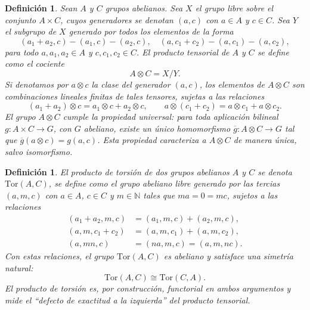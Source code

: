 \documentclass[12pt]{book}
\theoremstyle{plain}
\numberwithin{equation}{section} %
\newtheorem{definition}[thm]{Definición}
\begin{document}
\begin{definition}\label{def:tensor-product}
Sean $A$ y $C$ grupos abelianos. Sea $X$ el grupo libre sobre el conjunto
$A \times C$, cuyos generadores se denotan $(a,c)$ con $a \in A$ y $c \in C$.
Sea $Y$ el subgrupo de $X$ generado por todos los elementos de la forma
\[
(a_1 + a_2, c) - (a_1, c) - (a_2, c), \quad
(a, c_1 + c_2) - (a, c_1) - (a, c_2),
\]
para todo $a,a_1,a_2 \in A$ y $c,c_1,c_2 \in C$. El \textit{producto tensorial}
de $A$ y $C$ se define como el cociente
\[
A \otimes C = X / Y.
\]
Si denotamos por $a \otimes c$ la clase del generador $(a,c)$, los elementos de
$A \otimes C$ son combinaciones lineales finitas de tales tensores, sujetas a
las relaciones
\[
(a_1 + a_2) \otimes c = a_1 \otimes c + a_2 \otimes c, \qquad
a \otimes (c_1 + c_2) = a \otimes c_1 + a \otimes c_2.
\]
El grupo $A \otimes C$ cumple la \textit{propiedad universal}: para toda
aplicación bilineal $g : A \times C \to G$, con $G$ abeliano, existe un único
homomorfismo $\overline{g} : A \otimes C \to G$ tal que
$\overline{g}(a \otimes c) = g(a,c)$. Esta propiedad caracteriza a
$A \otimes C$ de manera única, salvo isomorfismo.
\end{definition}

\begin{definition}\label{def:tor}
El \textit{producto de torsión} de dos grupos abelianos $A$ y $C$ se denota
$\mathrm{Tor}(A,C)$, se define como el grupo abeliano libre generado por las tercias
$(a,m,c)$ con $a \in A$, $c \in C$ y $m \in \mathbb{N}$ tales que $ma = 0 = mc$,
sujetos a las relaciones
\[
\begin{aligned*}
(a_1 + a_2, m, c) &= (a_1, m, c) + (a_2, m, c),\\
(a, m, c_1 + c_2) &= (a, m, c_1) + (a, m, c_2),\\
(a, mn, c) &= (na, m, c) = (a, m, nc).
\end{aligned*}
\]
Con estas relaciones, el grupo $\mathrm{Tor}(A,C)$ es abeliano y satisface una
\textit{simetría natural}:
\[
\mathrm{Tor}(A,C) \cong \mathrm{Tor}(C,A).
\]
El producto de torsión es, por construcción, functorial en ambos argumentos y
mide el ``defecto de exactitud a la izquierda'' del producto tensorial.
\end{definition}

\end{document}
